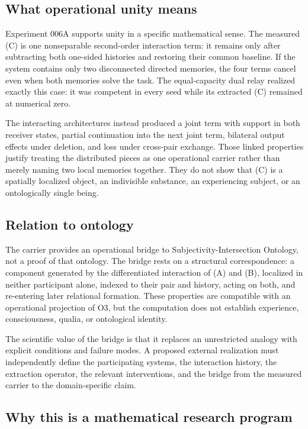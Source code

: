 \documentclass[11pt,a4paper]{article}
\begin{document}
\subsection{What operational unity means}

Experiment 006A supports unity in a specific mathematical sense. The measured (C) is one nonseparable second-order interaction term: it remains only after subtracting both one-sided histories and restoring their common baseline. If the system contains only two disconnected directed memories, the four terms cancel even when both memories solve the task. The equal-capacity dual relay realized exactly this case: it was competent in every seed while its extracted (C) remained at numerical zero.

The interacting architectures instead produced a joint term with support in both receiver states, partial continuation into the next joint term, bilateral output effects under deletion, and loss under cross-pair exchange. Those linked properties justify treating the distributed pieces as one operational carrier rather than merely naming two local memories together. They do not show that (C) is a spatially localized object, an indivisible substance, an experiencing subject, or an ontologically single being.

\subsection{Relation to ontology}

The carrier provides an operational bridge to Subjectivity-Intersection Ontology, not a proof of that ontology. The bridge rests on a structural correspondence: a component generated by the differentiated interaction of (A) and (B), localized in neither participant alone, indexed to their pair and history, acting on both, and re-entering later relational formation. These properties are compatible with an operational projection of O3, but the computation does not establish experience, consciousness, qualia, or ontological identity.

The scientific value of the bridge is that it replaces an unrestricted analogy with explicit conditions and failure modes. A proposed external realization must independently define the participating systems, the interaction history, the extraction operator, the relevant interventions, and the bridge from the measured carrier to the domain-specific claim.

\subsection{Why this is a mathematical research program}
\end{document}
